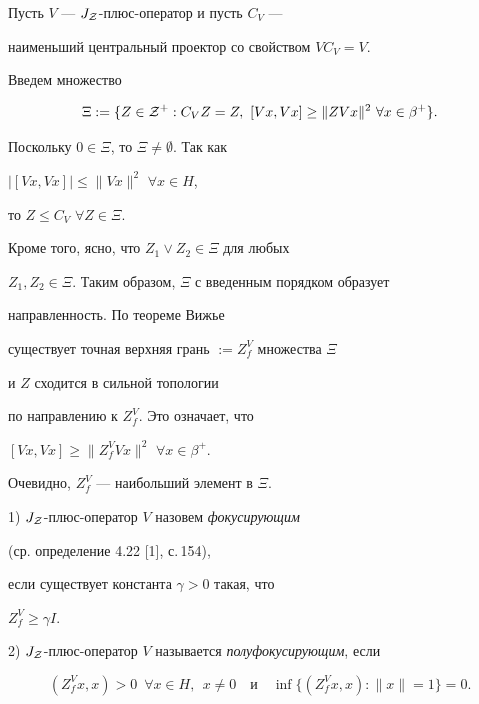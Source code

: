 Пусть $V$ --- $J_{\cal Z}$-плюс-оператор и пусть $C_{V}$ --- 


наименьший центральный проектор со свойством $VC_{V}=V$. 


Введем множество


$$


\Xi :=\{Z\in {\cal Z}^{+}: C_{V}Z=Z,\ [Vx,Vx]\geq \| ZVx\|^{2}


\ \forall x\in\beta^{+}\}.


$$


Поскольку $0\in\Xi$, то $\Xi\ne\emptyset$. Так как


$| [Vx,Vx]|\leq \| Vx\|^{2}$ $\forall x\in H$,


то $Z\leq C_{V}$ $\forall Z\in \Xi$.


Кроме того, ясно, что $Z_{1}\vee Z_{2}\in \Xi$ для любых


$Z_{1}, Z_{2}\in\Xi$. Таким образом, $\Xi$ с введенным порядком образует


направленность. По теореме Вижье 


существует точная верхняя грань $:=Z^{V}_{f}$ множества $\Xi$


и $Z$ сходится в сильной топологии


по направлению к $Z_{f}^{V}$. Это означает, что


$[Vx,Vx]\geq\| Z_{f}^{V}Vx\|^{2}$ $\forall x\in\beta^{+}$.


Очевидно, $Z_{f}^{V}$ --- наибольший элемент в $\Xi$.





\begin{defn}


1) $J_{\cal Z}$-плюс-оператор $V$ назовем {\it фокусирующим} 


(ср. определение 4.22 [1], с.\,154),


если существует константа $\gamma >0$ такая, что


$Z_{f}^{V}\geq\gamma I$.





2) $J_{\cal Z}$-плюс-оператор $V$ называется {\it полуфокусирующим}, если


$$


(Z_{f}^{V}x,x)>0 \ \; \forall x\in H,\ \ x\ne 0\quad \text{и}\quad


\inf\{(Z_{f}^{V}x,x):\| x\|=1\}=0.


$$


\end{defn}





